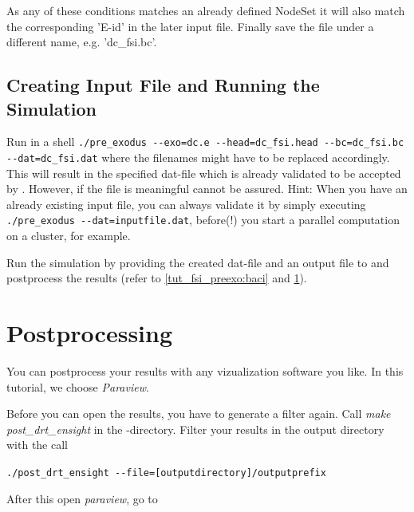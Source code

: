 As any of these conditions matches an already defined NodeSet it will also match the corresponding 'E-id' in the later \baci{} input file.
Finally save the file under a different name, e.g. 'dc\_fsi.bc'.

\subsection{Creating \baci{} Input File and Running the Simulation}
Run in a shell \verb|./pre_exodus --exo=dc.e --head=dc_fsi.head --bc=dc_fsi.bc --dat=dc_fsi.dat| where the filenames might have to be replaced accordingly. This will result in the specified dat-file which is already validated to be accepted by \baci{}. However, if the file is meaningful cannot be assured. Hint: When you have an already existing input file, you can always validate it by simply executing
\verb|./pre_exodus --dat=inputfile.dat|, before(!) you start a parallel \baci{} computation on a cluster, for example. \newline 

Run the simulation by providing the created dat-file and an output file to \baci{} and postprocess the results (refer to \ref{tut_fsi_preexo:baci} and \ref{tut_fsi_preexo:postprocess}).

\section{Postprocessing}
\label{tut_fsi_preexo:postprocess}
You can postprocess your results with any vizualization software you like. In this tutorial, we choose \emph{Paraview}. \newline

Before you can open the results, you have to generate a filter again. Call \emph{make post\_drt\_ensight} in the \baci{}-directory.
Filter your results in the output directory with the call 
\begin{center}
	\verb|./post_drt_ensight --file=[outputdirectory]/outputprefix|
\end{center}
After this open \emph{paraview}, go to

